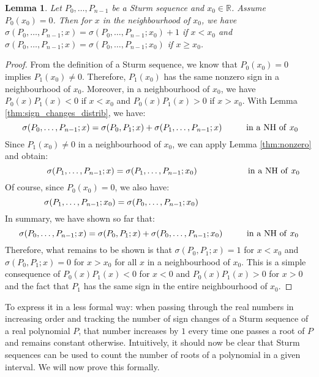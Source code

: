 \documentclass[11pt,a4paper,oneside]{article}
\newtheorem{lemma}[definition]{Lemma}
\newcommand{\RR}{\mathbb{R}}
\begin{document}
\newpage
\label{thm:zero}
\begin{lemma}
Let $P_0,\ldots,P_{n-1}$ be a Sturm sequence and $x_0\in\RR$. Assume $P_0(x_0)=0$. Then for $x$ in the neighbourhood of $x_0$, we have $\sigma(P_0,\ldots,P_{n-1};x)=\sigma(P_0,\ldots,P_{n-1};x_0)+1$ if $x<x_0$ and $\sigma(P_0,\ldots,P_{n-1};x)=\sigma(P_0,\ldots,P_{n-1};x_0)$ if $x\geq x_0$.
\end{lemma}
\begin{proof}
From the definition of a Sturm sequence, we know that $P_0(x_0)=0$ implies $P_1(x_0)\neq 0$. Therefore, $P_1(x_0)$ has the same nonzero sign in a neighbourhood of $x_0$. Moreover, in a neighbourhood of $x_0$, we have $P_0(x)P_1(x)<0$ if $x<x_0$ and $P_0(x)P_1(x)>0$ if $x>x_0$. With Lemma \ref{thm:sign_changes_distrib}, we have:
$$\hskip1mm\sigma(P_0,\ldots,P_{n-1};x)=\sigma(P_0,P_1;x)+\sigma(P_1,\ldots,P_{n-1};x) \hskip10mm\mathrm{in\ a\ NH\ of\ }x_0$$
Since $P_1(x_0)\neq 0$ in a neighbourhood of $x_0$, we can apply Lemma \ref{thm:nonzero} and obtain:
$$\hskip12mm\sigma(P_1,\ldots,P_{n-1};x) = \sigma(P_1,\ldots,P_{n-1};x_0) \hskip21mm\mathrm{in\ a\ NH\ of\ }x_0$$
Of course, since $P_0(x_0)=0$, we also have:
$$\sigma(P_1,\ldots,P_{n-1};x_0) = \sigma(P_0,\ldots,P_{n-1};x_0)\hskip31mm$$
In summary, we have shown so far that:
$$\sigma(P_0,\ldots,P_{n-1};x)=\sigma(P_0,P_1;x) + \sigma(P_0,\ldots,P_{n-1};x_0) \hskip10mm\mathrm{in\ a\ NH\ of\ }x_0$$
Therefore, what remains to be shown is that $\sigma(P_0,P_1;x)=1$ for $x<x_0$ and $\sigma(P_0,P_1;x)=0$ for $x>x_0$ for all $x$ in a neighbourhood of $x_0$. This is a simple consequence of $P_0(x)P_1(x)<0$ for $x<0$ and $P_0(x)P_1(x)>0$ for $x>0$ and the fact that $P_1$ has the same sign in the entire neighbourhood of $x_0$.
\end{proof}\vskip5mm

To express it in a less formal way: when passing through the real numbers in increasing order and tracking the number of sign changes of a Sturm sequence of a real polynomial $P$, that number increases by $1$ every time one passes a root of $P$ and remains constant otherwise. Intuitively, it should now be clear that Sturm sequences can be used to count the number of roots of a polynomial in a given interval. We will now prove this formally.
\end{document}
